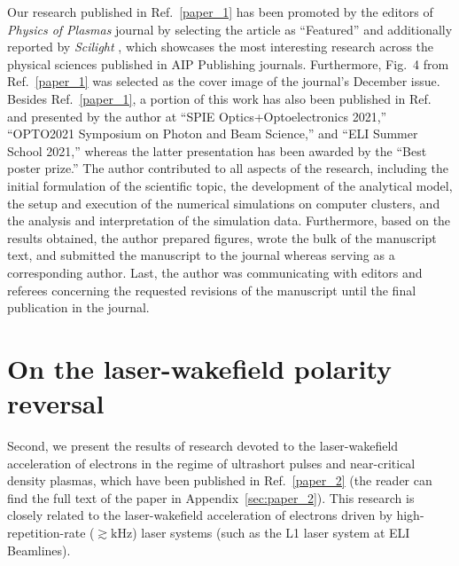 \documentclass[10pt, a4paper, twoside, openright]{report}
\newcommand{\q}[1]{``#1''} %
\begin{document}
Our research published in Ref.~\ref{paper_1} has been promoted by the editors of \textit{Physics of Plasmas} journal by selecting the article as \q{Featured} and additionally reported by \textit{Scilight} \cite{Patrick2021}, which showcases the most interesting research across the physical sciences published in AIP Publishing journals. Furthermore, Fig.~4 from Ref.~\ref{paper_1} was selected as the cover image of the journal's December issue. Besides Ref.~\ref{paper_1}, a portion of this work has also been published in Ref.~ and presented by the author at \q{SPIE Optics+Optoelectronics 2021,} \q{OPTO2021 Symposium on Photon and Beam Science,} and \q{ELI Summer School 2021,} whereas the latter presentation has been awarded by the \q{Best poster prize.} The author contributed to all aspects of the research, including the initial formulation of the scientific topic, the development of the analytical model, the setup and execution of the numerical simulations on computer clusters, and the analysis and interpretation of the simulation data. Furthermore, based on the results obtained, the author prepared figures, wrote the bulk of the manuscript text, and submitted the manuscript to the journal whereas serving as a corresponding author. Last, the author was communicating with editors and referees concerning the requested revisions of the manuscript until the final publication in the journal.

\section{On the laser-wakefield polarity reversal\label{sec:on_the_laser-wakefield_polarity_reversal}}
%

Second, we present the results of research devoted to the laser-wakefield acceleration of electrons in the regime of ultrashort pulses and near-critical density plasmas, which have been published in Ref.~\ref{paper_2} (the reader can find the full text of the paper in Appendix~\ref{sec:paper_2}). This research is closely related to the laser-wakefield acceleration of electrons driven by high-repetition-rate ($ \gtrsim \mathrm{kHz} $) laser systems (such as the L1 laser system at ELI Beamlines). 
\end{document}

